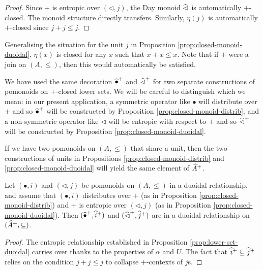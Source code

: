\begin{proof}
  Since $+$ is entropic over $(\lhd, j)$, the Day monoid $\mathop{\widehat{\lhd}}$
  is automatically $+$-closed. The monoid structure directly
  transfers. Similarly, $\eta(j)$ is automatically $+$-closed since
  $j + j \leq j$.
\end{proof}

\begin{remark}
  Generalising the situation for the unit $j$ in Proposition
  \ref{prop:closed-monoid-duoidal}, $\eta(x)$ is closed for any $x$
  such that $x + x \leq x$. Note that if $+$ were a join on
  $(A, \leq)$, then this would automatically be satisfied.
\end{remark}

\begin{remark}
  We have used the same decoration $\mathop{\widehat{\bullet}^+}$ and
  $\mathop{\widehat{\lhd}^+}$ for two separate constructions of pomonoids on
  $+$-closed lower sets. We will be careful to distinguish which we
  mean: in our present application, a symmetric operator like
  $\bullet$ will distribute over $+$ and so $\mathop{\widehat{\bullet}^+}$ will
  be constructed by Proposition \ref{prop:closed-monoid-distrib}; and
  a non-symmetric operator like $\lhd$ will be entropic with respect
  to $+$ and so $\mathop{\widehat{\lhd}^+}$ will be constructed by Proposition
  \ref{prop:closed-monoid-duoidal}.
\end{remark}

\begin{remark}
  If we have two pomonoids on $(A, \leq)$ that share a unit, then the
  two constructions of units in Propositions
  \ref{prop:closed-monoid-distrib} and
  \ref{prop:closed-monoid-duoidal} will yield the same element of
  $\widehat{A}^+$.
\end{remark}

\begin{proposition}
  Let $(\bullet, i)$ and $(\lhd, j)$ be pomonoids on $(A, \leq)$ in a
  duoidal relationship, and assume that $(\bullet, i)$ distributes
  over $+$ (as in Proposition \ref{prop:closed-monoid-distrib}) and
  $+$ is entropic over $(\lhd, j)$ (as in Proposition
  \ref{prop:closed-monoid-duoidal}). Then
  $(\mathop{\widehat{\bullet}^+}, \mathop{\widehat{i}^+})$ and
  $(\mathop{\widehat{\lhd}^+}, \mathop{\widehat{j}^+})$ are in a duoidal relationship on
  $(\widehat{A}^+, \subseteq)$.
\end{proposition}

\begin{proof}
  The entropic relationship established in Proposition
  \ref{prop:lower-set-duoidal} carries over thanks to the properties
  of $\alpha$ and $U$. The fact that
  $\mathop{\widehat{i}^+} \subseteq \mathop{\widehat{j}^+}$ relies on the condition
  $j + j \leq j$ to collapse $+$-contexts of $j$s.
\end{proof}

